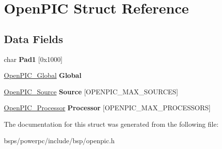\hypertarget{structOpenPIC}{}\section{Open\+P\+IC Struct Reference}
\label{structOpenPIC}
\subsection*{Data Fields}
\begin{DoxyCompactItemize}
\item 
\mbox{\label{structOpenPIC_a0f8c9cf2f40d36a5561316c2ac6f15d4}} 
char {\bfseries Pad1} \mbox{[}0x1000\mbox{]}
\item 
\mbox{\label{structOpenPIC_a17f1e1cc3ad928975bb353d998de9dd4}} 
\mbox{\hyperlink{struct__OpenPIC__Global}{Open\+P\+I\+C\+\_\+\+Global}} {\bfseries Global}
\item 
\mbox{\label{structOpenPIC_af75a30cba2bc81cf14ec7e4c03917f4e}} 
\mbox{\hyperlink{struct__OpenPIC__Source}{Open\+P\+I\+C\+\_\+\+Source}} {\bfseries Source} \mbox{[}O\+P\+E\+N\+P\+I\+C\+\_\+\+M\+A\+X\+\_\+\+S\+O\+U\+R\+C\+ES\mbox{]}
\item 
\mbox{\label{structOpenPIC_a555b6cb8bb7effb85894b816e919293a}} 
\mbox{\hyperlink{struct__OpenPIC__Processor}{Open\+P\+I\+C\+\_\+\+Processor}} {\bfseries Processor} \mbox{[}O\+P\+E\+N\+P\+I\+C\+\_\+\+M\+A\+X\+\_\+\+P\+R\+O\+C\+E\+S\+S\+O\+RS\mbox{]}
\end{DoxyCompactItemize}


The documentation for this struct was generated from the following file\+:\begin{DoxyCompactItemize}
\item 
bsps/powerpc/include/bsp/openpic.\+h\end{DoxyCompactItemize}

